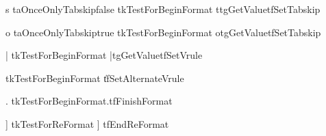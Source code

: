 
\NewFormatKey s{%
  \!taOnceOnlyTabskipfalse    %
  \!tkTestForBeginFormat t{\!tgGetValue{\!tfSetTabskip}}}

\NewFormatKey o{%
  \!taOnceOnlyTabskiptrue
  \!tkTestForBeginFormat o{\!tgGetValue{\!tfSetTabskip}}}



\NewFormatKey |{%
  \!tkTestForBeginFormat |{\!tgGetValue{\!tfSetVrule}}}

\NewFormatKey \|{%
  \!tkTestForBeginFormat \|{\!tfSetAlternateVrule}}



\NewFormatKey .{%
  \!tkTestForBeginFormat.{\!tfFinishFormat}}

\NewFormatKey {}

\NewFormatKey ]{%
  \!tkTestForReFormat ] \!tfEndReFormat}



\def\!tkTestForBeginFormat#1#2{%
  \if!taBeginFormat
    \def\!ttemp{#2}%
    \!thx \!ttemp
  \else
    \toks0={#1}%
    \toks2=\!thx{\string\ReFormat}%
    \!thx \!tkImproperUse
  \fi}

